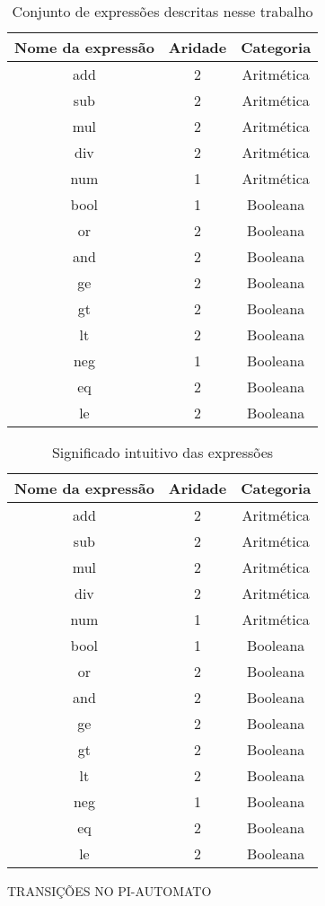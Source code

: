 \begin{table}[]
    \centering
    \begin{tabular}{|c|c|c|}
    \hline
         Nome da expressão & Aridade & Categoria\\\hline\hline
         add & 2 & Aritmética\\\hline
         sub & 2 & Aritmética\\\hline
         mul & 2 & Aritmética\\\hline
         div & 2 & Aritmética\\\hline
         num & 1 & Aritmética\\\hline
         bool & 1 & Booleana\\\hline
         or & 2 & Booleana\\\hline
         and & 2 & Booleana\\\hline
         ge & 2 & Booleana\\\hline
         gt & 2 & Booleana\\\hline
         lt & 2 & Booleana\\\hline
         neg & 1 & Booleana\\\hline
         eq & 2 & Booleana\\\hline
         le & 2 & Booleana\\\hline
    \hline
    \end{tabular}
    \caption{Conjunto de expressões descritas nesse trabalho}
    \label{tab:expressoes}
\end{table}
\begin{table}[]
    \centering
    \begin{tabular}{|c|c|c|}
    \hline
         Nome da expressão & Aridade & Categoria\\\hline\hline
         add & 2 & Aritmética\\\hline
         sub & 2 & Aritmética\\\hline
         mul & 2 & Aritmética\\\hline
         div & 2 & Aritmética\\\hline
         num & 1 & Aritmética\\\hline
         bool & 1 & Booleana\\\hline
         or & 2 & Booleana\\\hline
         and & 2 & Booleana\\\hline
         ge & 2 & Booleana\\\hline
         gt & 2 & Booleana\\\hline
         lt & 2 & Booleana\\\hline
         neg & 1 & Booleana\\\hline
         eq & 2 & Booleana\\\hline
         le & 2 & Booleana\\\hline
    \hline
    \end{tabular}
    \caption{Significado intuitivo das expressões}
    \label{tab:significadoExpressoes}
\end{table}
TRANSIÇÕES NO PI-AUTOMATO
